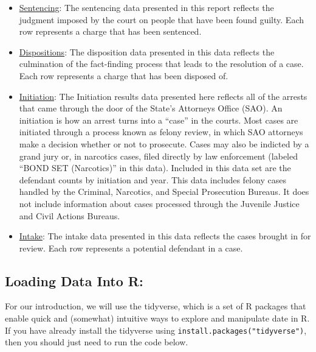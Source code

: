 \documentclass[]{article}
\providecommand{\tightlist}{%
  \setlength{\itemsep}{0pt}\setlength{\parskip}{0pt}}
\begin{document}
\begin{itemize}
\tightlist
\item
  \href{https://datacatalog.cookcountyil.gov/Courts/Sentencing/tg8v-tm6u}{Sentencing}:
  The sentencing data presented in this report reflects the judgment
  imposed by the court on people that have been found guilty. Each row
  represents a charge that has been sentenced.
\item
  \href{https://datacatalog.cookcountyil.gov/Courts/Dispositions/apwk-dzx8}{Dispositions}:
  The disposition data presented in this data reflects the culmination
  of the fact-finding process that leads to the resolution of a case.
  Each row represents a charge that has been disposed of.
\item
  \href{https://datacatalog.cookcountyil.gov/Courts/Initiation/7mck-ehwz}{Initiation}:
  The Initiation results data presented here reflects all of the arrests
  that came through the door of the State's Attorneys Office (SAO). An
  initiation is how an arrest turns into a ``case'' in the courts. Most
  cases are initiated through a process known as felony review, in which
  SAO attorneys make a decision whether or not to prosecute. Cases may
  also be indicted by a grand jury or, in narcotics cases, filed
  directly by law enforcement (labeled ``BOND SET (Narcotics)'' in this
  data). Included in this data set are the defendant counts by
  initiation and year. This data includes felony cases handled by the
  Criminal, Narcotics, and Special Prosecution Bureaus. It does not
  include information about cases processed through the Juvenile Justice
  and Civil Actions Bureaus.
\item
  \href{https://datacatalog.cookcountyil.gov/Courts/Intake/3k7z-hchi}{Intake}:
  The intake data presented in this data reflects the cases brought in
  for review. Each row represents a potential defendant in a case.
\end{itemize}

\subsection{Loading Data Into R:}\label{loading-data-into-r}

For our introduction, we will use the tidyverse, which is a set of R
packages that enable quick and (somewhat) intuitive ways to explore and
manipulate date in R. If you have already install the tidyverse using
\texttt{install.packages("tidyverse")}, then you should just need to run
the code below.
\end{document}
